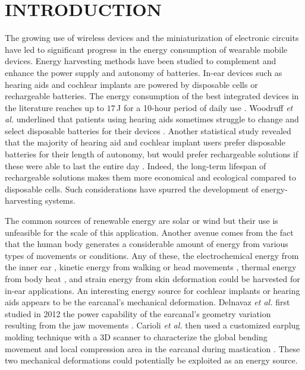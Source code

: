 \documentclass[3p,twocolumn,preprint]{elsarticle}
\begin{document}
\section{INTRODUCTION}
\label{INTRODUCTION}
The growing use of wireless devices and the miniaturization of electronic circuits have led to significant progress in the energy consumption of wearable mobile devices. Energy harvesting methods have been studied to complement and enhance the power supply and autonomy of batteries. In-ear devices such as hearing aids and cochlear implants are powered by disposable cells or rechargeable batteries. The energy consumption of the best integrated devices in the literature reaches up to $17$\,J for a 10-hour period of daily use \cite{Scherer2019,Yip2015,Kulah2022}. Woodruff \emph{et al.} underlined that patients using hearing aids sometimes struggle to change and select disposable batteries for their devices \cite{Woodruff2021}. Another statistical study revealed that the majority of hearing aid and cochlear implant users prefer disposable batteries for their length of autonomy, but would prefer rechargeable solutions if these were able to last the entire day \cite{PracticesAudiology2016}. Indeed, the long-term lifespan of rechargeable solutions makes them more economical and ecological compared to disposable cells. Such considerations have spurred the development of energy-harvesting systems.

The common sources of renewable energy are solar or wind but their use is unfeasible for the scale of this application. Another avenue comes from the fact that the human body generates a considerable amount of energy from various types of movements or conditions. Any of these, the electrochemical energy from the inner ear \cite{Mercier2012}, kinetic energy from walking or head movements \cite{Azimi2021,Smilek2016}, thermal energy from body heat \cite{Kim2014}, and strain energy from skin deformation \cite{Jin2021} could be harvested for in-ear applications. An interesting energy source for cochlear implants or hearing aids appears to be the earcanal's mechanical deformation. Delnavaz \emph{et al.} first studied in 2012 the power capability of the earcanal's geometry variation resulting from the jaw movements \cite{Delnavaz2012}. Carioli \emph{et al.} then used a customized earplug molding technique with a 3D scanner to characterize the global bending movement and local compression area in the earcanal during mastication \cite{Carioli2016}. These two mechanical deformations could potentially be exploited as an energy source.
\end{document}
